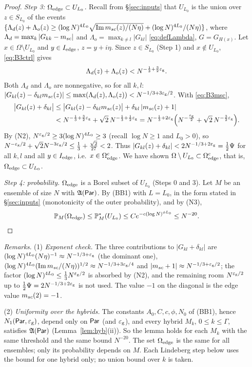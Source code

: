 \begin{proof}
\emph{Step 3: $\Omega_{\rm edge}\subset U_{L_0}$.} Recall from \S\ref{sec:inputs} that $U_{L_0}$ is the union over $z\in S_{L_0}$ of the events
$\{\Lambda_d(z)+\Lambda_o(z)\ge(\log N)^{4L_0}\sqrt{\im\msc(z)/(N\eta)}+(\log N)^{4L_0}/(N\eta)\}$, where $\Lambda_d=\max_k|G_{kk}-\msc|$ and $\Lambda_o=\max_{k\ne l}|G_{kl}|$ \eqref{eq:defLambda},
$G=G_{H(x)}$. Let $x\in\Omega\setminus U_{L_0}$ and $y\in I_{\rm edge}$, $z=y+i\eta$. Since $z\in S_{L_0}$ (Step 1) and $x\notin U_{L_0}$, \eqref{eq:B3ctrl} gives
\[
\Lambda_d(z)+\Lambda_o(z)<N^{-\frac13+\frac32\eg}.
\]
Both $\Lambda_d$ and $\Lambda_o$ are nonnegative, so for all $k,l$: $|G_{kl}(z)-\delta_{kl}\msc(z)|\le\max(\Lambda_d(z),\Lambda_o(z))<N^{-1/3+3\eg/2}$. With \eqref{eq:B3msc},
\begin{align*}
\big|G_{kl}(z)+\delta_{kl}\big|&\le\big|G_{kl}(z)-\delta_{kl}\msc(z)\big|+\delta_{kl}\,|\msc(z)+1|\\
&<N^{-\frac13+\frac32\eg}+\sqrt2\,N^{-\frac13+\frac12\eg}=N^{-\frac13+2\eg}\Big(N^{-\frac{\eg}2}+\sqrt2\,N^{-\frac32\eg}\Big).
\end{align*}
By \textup{(N2)}, $N^{\eg/2}\ge3(\log N)^{4L_0}\ge3$ (recall $\log N\ge1$ and $L_0>0$), so $N^{-\eg/2}+\sqrt2N^{-3\eg/2}\le\frac13+\frac{\sqrt2}{27}<2$. Thus
$|G_{kl}(z)+\delta_{kl}|<2N^{-1/3+2\eg}=\frac12\Psi$ for all $k,l$ and all $y\in I_{\rm edge}$, i.e.\ $x\in\Omega^c_{\rm edge}$. We have shown
$\Omega\setminus U_{L_0}\subset\Omega^c_{\rm edge}$, that is, $\Omega_{\rm edge}\subset U_{L_0}$.

\emph{Step 4: probability.} $\Omega_{\rm edge}$ is a Borel subset of $U_{L_0}$ (Steps 0 and 3). Let $M$ be an ensemble of size $N$ with $\fA(\Par)$. By \textup{(BB1)} with $L=L_0$,
in the form stated in \S\ref{sec:inputs} (monotonicity of the outer probability), and by \textup{(N3)},
\[
\P_M(\Omega_{\rm edge})\le\P_M^*(U_{L_0})\le Ce^{-c(\log N)^{\phi L_0}}\le N^{-20}.\qedhere
\]
\end{proof}

\noindent\emph{Remarks.} (1) \emph{Exponent check.} The three contributions to $|G_{kl}+\delta_{kl}|$ are $(\log N)^{4L_0}(N\eta)^{-1}\approx N^{-1/3+\eg}$ (the dominant one),
$(\log N)^{4L_0}(\im\msc/(N\eta))^{1/2}\approx N^{-1/3+3\eg/4}$ and $|\msc+1|\approx N^{-1/3+\eg/2}$; the factor $(\log N)^{4L_0}\le\frac13N^{\eg/2}$ is absorbed by (N2), and the
remaining room $N^{\eg/2}$ up to $\frac12\Psi=2N^{-1/3+2\eg}$ is not used. The value $-1$ on the diagonal is the edge value $\msc(2)=-1$.

(2) \emph{Uniformity over the hybrids.} The constants $A_0,C,c,\phi,N_0$ of \textup{(BB1)}, hence $N_1(\Par,\eg)$, depend only on $\Par$ (and $\eg$), and every hybrid $M_k$,
$0\le k\le\Gamma$, satisfies $\fA(\Par)$ (Lemma~\ref{lem:hyb}(ii)). So the lemma holds for each $M_k$ with the same threshold and the same bound $N^{-20}$. The set $\Omega_{\rm edge}$
is the same for all ensembles; only its probability depends on $M$. Each Lindeberg step below uses the bound for one hybrid only; no union bound over $k$ is taken.


